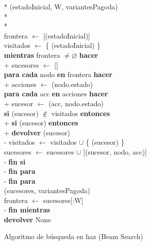 \documentclass[conference,a4paper]{IEEEtran}
\begin{document}
\begin{figure}
  \small
  \begin{pseudo}*
    (estadoInicial, W, variantesPagoda) \\*
     \\*
     \\
    frontera $\leftarrow$ [(estadoInicial)] \\
    visitados $\leftarrow$ \{ (estadoInicial) \} \\
    \textbf{mientras} frontera $\neq \varnothing$ \textbf{hacer} \\+
      sucesores $\leftarrow$ [] \\
      \textbf{para cada} nodo \textnormal{\textbf{en}} frontera \textbf{hacer} \\+
        acciones $\leftarrow$ (nodo.estado) \\
        \textbf{para cada} acc \textnormal{\textbf{en}} acciones \textbf{hacer} \\+
          sucesor $\leftarrow$ (acc, nodo.estado) \\
          \textbf{si} (sucesor) $\notin$ visitados \textbf{entonces} \\+
            \textbf{si} (sucesor) \textbf{entonces} \\+
              \textbf{devolver} (sucesor) \\-
            visitados $\leftarrow$ visitados $\cup$ \{ (sucesor) \} \\
            sucesores $\leftarrow$ sucesores $\cup$ [(sucesor, nodo, acc)] \\-
          \textbf{fin si} \\-
        \textbf{fin para} \\-
      \textbf{fin para} \\
      (sucesores, variantesPagoda) \\
      frontera $\leftarrow$ sucesores[:W] \\-
    \textbf{fin mientras} \\
    \textbf{devolver} None
  \end{pseudo}
  \caption{Algoritmo de búsqueda en haz (Beam Search)}
  \label{pcd:beam}
\end{figure}
\end{document}
